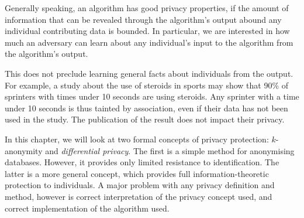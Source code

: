 {  Generally speaking, an algorithm has good privacy properties, if the
  amount of information that can be revealed through the algorithm's
  output abound any individual contributing data is bounded. In
  particular, we are interested in how much an adversary can learn
  about any individual's input to the algorithm from the algorithm's
  output.

  This does not preclude learning general facts about individuals from
  the output. For example, a study about the use of steroids in sports
  may show that 90\% of sprinters with times under 10 seconds are
  using steroids. Any sprinter with a time under 10 seconds is thus
  tainted by association, even if their data has not been used in the
  study. The publication of the result does not impact their privacy.
  
  In this chapter, we will look at two formal concepts of privacy
  protection: $k$-anonymity and \emph{differential privacy}. The first
  is a simple method for anonymising databases. However, it provides
  only limited resistance to identification. The latter is a more
  general concept, which provides full information-theoretic
  protection to individuals. A major problem with any privacy
  definition and method, however is correct interpretation of the
  privacy concept used, and correct implementation of the algorithm
  used.
}

